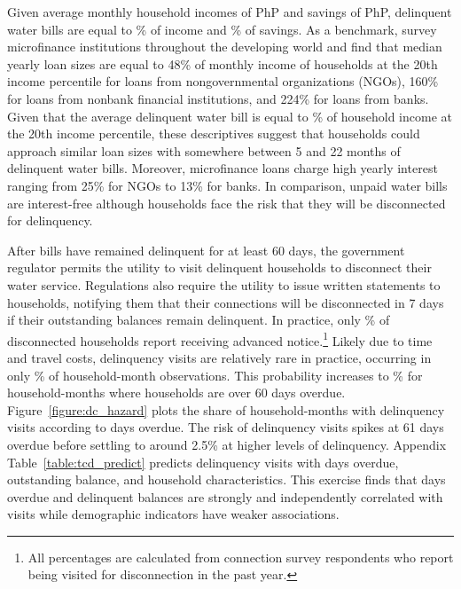 \documentclass[12pt]{article}
\begin{document}
Given average monthly household incomes of PhP and savings of PhP, delinquent water bills are equal to \unskip\% of income and \unskip\% of savings.  As a benchmark, \cite{cull2009microfinance} survey microfinance institutions throughout the developing world and find that median yearly loan sizes are equal to 48\% of monthly income of households at the 20th income percentile for loans from nongovernmental organizations (NGOs), 160\% for loans from nonbank financial institutions, and 224\% for loans from banks.  Given that the average delinquent water bill is equal to \unskip\% of household income at the 20th income percentile, these descriptives suggest that households could approach similar loan sizes with somewhere between 5 and 22 months of delinquent water bills.   Moreover, microfinance loans charge high yearly interest ranging from 25\% for NGOs to 13\% for banks.  In comparison, unpaid water bills are interest-free although households face the risk that they will be disconnected for delinquency. %

After bills have remained delinquent for at least 60 days, the government regulator permits the utility to visit delinquent households to disconnect their water service.  Regulations also require the utility to issue written statements to households, notifying them that their connections will be disconnected in 7 days if their outstanding balances remain delinquent.  In practice, only \unskip\% of disconnected households report receiving advanced notice.\footnote{All percentages are calculated from connection survey respondents who report being visited for disconnection in the past year. }  Likely due to time and travel costs, delinquency visits are relatively rare in practice, occurring in only \unskip\% of household-month observations.  This probability increases to \unskip\% for household-months where households are over 60 days overdue.  Figure~\ref{figure:dc_hazard} plots the share of household-months with delinquency visits according to days overdue.  The risk of delinquency visits spikes at 61 days overdue before settling to around 2.5\% at higher levels of delinquency.  Appendix Table~\ref{table:tcd_predict} predicts delinquency visits with days overdue, outstanding balance, and household characteristics.  This exercise finds that days overdue and delinquent balances are strongly and independently correlated with visits while demographic indicators have weaker associations. %
\end{document}
